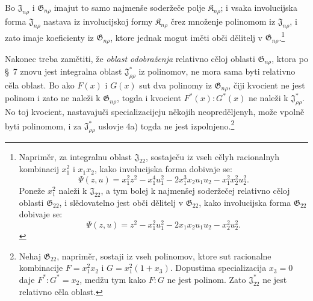 \documentclass[11pt]{article}
\providecommand{\Kfield}{\mathfrak{K}}
\providecommand{\Jdom}{\mathfrak{J}}
\providecommand{\Gdom}{\mathfrak{G}}
\begin{document}
Bo $\Jdom_{n\rho}$ i $\Gdom_{n\rho}$ imajut to samo najmenše soderžeče polje $\Kfield_{n\rho}$; i vsaka involucijska forma $\Jdom_{n\rho}$ nastava iz involucijskoj formy $\Kfield_{n\rho}$ črez množenje polinomom iz $\Jdom_{n\rho}$, i zato imaje koeficienty iz $\Gdom_{n\rho}$, ktore jednak mogut iměti obči dělitelj v $\Gdom_{n\rho}$.\footnote{Napriměr, za integralnu oblast $\Jdom_{22}$, sostaječu iz vseh cělyh racionalnyh kombinacij $x_1^2$ i $x_1x_2$, kako involucijska forma dobivaje se:
\[
\Psi(z,u)=x_1^2z^2-x_1^4u_1^2-2x_1^3x_2u_1u_2-x_1^2x_2^2u_2^2.
\]
Poneže $x_1^2$ naleži k $\Jdom_{22}$, a tym bolej k najmenšej soderžečej relativno cěloj oblasti $\Gdom_{22}$, i slědovatelno jest obči dělitelj v $\Gdom_{22}$, kako involucijska forma $\Gdom_{22}$ dobivaje se:
\[
\Psi(z,u)=z^2-x_1^2u_1^2-2x_1x_2u_1u_2-x_2^2u_2^2.
\]}

Nakonec treba zamětiti, že \emph{oblast odobraženja} relativno cěloj oblasti $\Gdom_{n\rho}$, ktora po \S\ 7 znovu jest integralna oblast $\Jdom^*_{\rho\rho}$ iz polinomov, ne mora sama byti relativno cěla oblast. Bo ako $F(x)$ i $G(x)$ sut dva polinomy iz $\Gdom_{n\rho}$, čiji kvocient ne jest polinom i zato ne naleži k $\Gdom_{n\rho}$, togda i kvocient $F^*(x):G^*(x)$ ne naleži k $\Jdom^*_{\rho\rho}$. No toj kvocient, nastavajuči specializacijeju někojih neopreděljenyh, može vpolně byti polinomom, i za $\Jdom^*_{\rho\rho}$ uslovje 4a) togda ne jest izpolnjeno.\footnote{Nehaj $\Gdom_{22}$, napriměr, sostaji iz vseh polinomov, ktore sut racionalne kombinacije $F=x_1^2x_2$ i $G=x_1^2(1+x_3)$. Dopustima specializacija $x_3=0$ daje $F^*:G^*=x_2$, medžu tym kako $F:G$ ne jest polinom. Zato $\Jdom^*_{22}$ ne jest relativno cěla oblast.}
\end{document}

